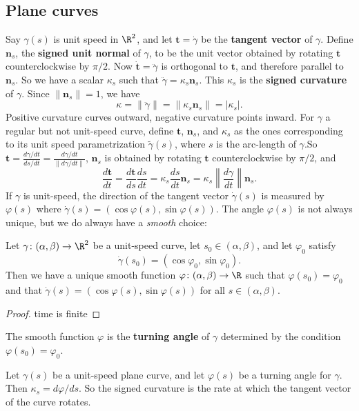 \subsection{Plane curves}
Say $\gamma (s)$ is unit speed in $\R^2$, and let $\mathbf t=\dot\gamma $ be the \textbf{tangent vector} of $\gamma $. Define $\mathbf n_s$, the \textbf{signed unit normal} of $\gamma $, to be the unit vector obtained by rotating $\mathbf t$ counterclockwise by $\pi /2$. Now $\dot {\mathbf t}=\ddot\gamma $ is orthogonal to $\mathbf t$, and therefore parallel to $\mathbf n_s$. So we have a scalar $\kappa_s$ such that $\ddot\gamma =\kappa_s\mathbf n_s$. This $\kappa_s$ is the \textbf{signed curvature} of $\gamma $. Since $\| \mathbf n_s\|=1$, we have \[
\kappa=\|\ddot\gamma \|=\|\kappa_s\mathbf n_s\|=|\kappa_s|.
\] Positive curvature curves outward, negative curvature points inward. For $\gamma $ a regular but not unit-speed curve, define $\mathbf t$, $\mathbf n_s$, and $\kappa_s$ as the ones corresponding to its unit speed parametrization $\widetilde \gamma (s)$, where $s$ is the arc-length of $\gamma $.So $\mathbf t= \frac{d\gamma  /dt}{ds /dt}= \frac{d\gamma  /dt}{\| d\gamma  /dt\|}$, $\mathbf n_s$ is obtained by rotating $\mathbf t$ counterclockwise by $\pi /2$, and \[
\frac{d\mathbf t}{dt}=\frac{d\mathbf t}{ds}\frac{ds}{dt}=\kappa_s \frac{ds}{dt}\mathbf n_s= \kappa_s \left\|\frac{d\gamma}{dt} \right\|\mathbf n_s.
\] If $\gamma $ is unit-speed, the direction of the tangent vector $\dot\gamma (s)$ is measured by $\varphi (s)$ where $\dot \gamma (s)=(\cos \varphi (s), \sin \varphi (s))$. The angle $\varphi (s)$ is not always unique, but we do always have a \emph{smooth} choice:
\begin{prop}
    Let $\gamma \colon (\alpha ,\beta ) \to \R^2$ be a unit-speed curve, let $s_0 \in (\alpha ,\beta )$, and let $\varphi_0$ satisfy \[
        \dot\gamma (s_0)=(\cos \varphi_0, \sin \varphi_0).  
    \] Then we have a unique smooth function $\varphi  \colon (\alpha ,\beta ) \to \R$ such that $\varphi (s_0)=\varphi_0 $ and that $\dot \gamma (s)=(\cos \varphi (s), \sin \varphi (s))$ for all $s \in (\alpha ,\beta )$.
\end{prop}
\begin{proof}
    time is finite
\end{proof}
\begin{definition}[]
    The smooth function $\varphi $ is the \textbf{turning angle} of $\gamma $ determined by the condition $\varphi (s_0)= \varphi_0 $.
\end{definition}
\begin{prop}
    Let $\gamma (s)$ be a unit-speed plane curve, and let $\varphi (s)$ be a turning angle for $\gamma $. Then $\kappa_s= d\varphi  /ds$. So the signed curvature is the rate at which the tangent vector of the curve rotates.
\end{prop}
